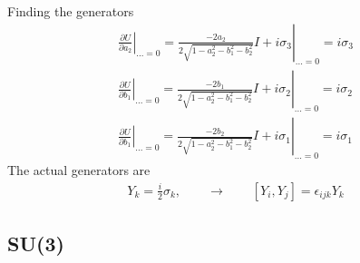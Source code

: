 \documentclass[../main.tex]{subfiles}
\begin{document}
Finding the generators
\begin{align*}
\left.\frac{\partial U}{\partial a_2}\right|_{...=0}=\left.\frac{-2a_2}{2\sqrt{1-a_2^2-b_1^2-b_2^2}}I+i\sigma_3\right|_{...=0}=i\sigma_3\\
\left.\frac{\partial U}{\partial b_1}\right|_{...=0}=\left.\frac{-2b_1}{2\sqrt{1-a_2^2-b_1^2-b_2^2}}I+i\sigma_2\right|_{...=0}=i\sigma_2\\
\left.\frac{\partial U}{\partial b_1}\right|_{...=0}=\left.\frac{-2b_2}{2\sqrt{1-a_2^2-b_1^2-b_2^2}}I+i\sigma_1\right|_{...=0}=i\sigma_1
\end{align*}
The actual generators are
\begin{align*}
Y_k=\frac{i}{2}\sigma_k,\qquad\rightarrow\qquad[Y_i,Y_j]=\epsilon_{ijk}Y_k
\end{align*}

\subsection{SU(3)}
\end{document}
